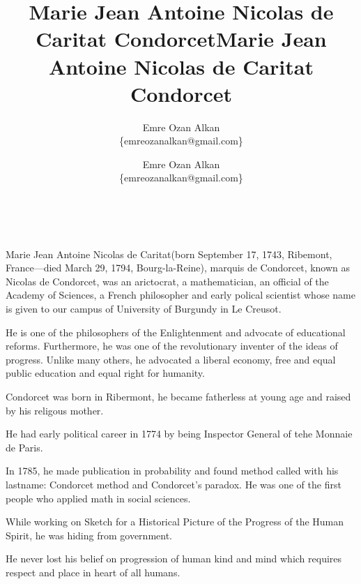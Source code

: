 \documentclass[10pt,a4paper,titlepage]{report}
\author{Emre Ozan Alkan \\ \{emreozanalkan@gmail.com\}}
\title{Marie Jean Antoine Nicolas de Caritat Condorcet}
\begin{document}
\maketitle

\begin{center}
\title{Marie Jean Antoine Nicolas de Caritat Condorcet}\\
\author{Emre Ozan Alkan \\ \{emreozanalkan@gmail.com\}}
\end{center}

Marie Jean Antoine Nicolas de Caritat(born September 17, 1743, Ribemont, France—died March 29, 1794, Bourg-la-Reine), marquis de Condorcet, known as Nicolas de Condorcet, was an arictocrat, a mathematician, an official of the Academy of Sciences, a French philosopher and early polical scientist whose name is given to our campus of University of Burgundy in Le Creusot.


He is one of the philosophers of the Enlightenment and advocate of educational reforms. Furthermore, he was one of the revolutionary inventer of the ideas of progress. Unlike many others, he advocated a liberal economy, free and equal public education and equal right for humanity.


Condorcet was born in Ribermont, he became fatherless at young age and raised by his religous mother.


He had early political career in 1774 by being Inspector General of tehe Monnaie de Paris.


In 1785, he made publication in probability and found method called with his lastname: Condorcet method and Condorcet's paradox. He was one of the first people who applied math in social sciences.

While working on Sketch for a Historical Picture of the Progress of the Human Spirit, he was hiding from government. 

He never lost his belief on progression of human kind and mind which requires respect and place in heart of all humans.
\end{document}
